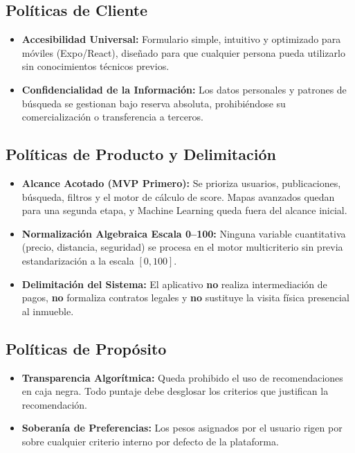 \documentclass[11pt,a4paper]{article}
\begin{document}
\subsection{Políticas de Cliente}
\begin{itemize}[leftmargin=*]
    \item \textbf{Accesibilidad Universal:} Formulario simple, intuitivo y optimizado para móviles (Expo/React), diseñado para que cualquier persona pueda utilizarlo sin conocimientos técnicos previos.
    \item \textbf{Confidencialidad de la Información:} Los datos personales y patrones de búsqueda se gestionan bajo reserva absoluta, prohibiéndose su comercialización o transferencia a terceros.
\end{itemize}

\subsection{Políticas de Producto y Delimitación}
\begin{itemize}[leftmargin=*]
    \item \textbf{Alcance Acotado (MVP Primero):} Se prioriza usuarios, publicaciones, búsqueda, filtros y el motor de cálculo de score. Mapas avanzados quedan para una segunda etapa, y Machine Learning queda fuera del alcance inicial.
    \item \textbf{Normalización Algebraica Escala 0--100:} Ninguna variable cuantitativa (precio, distancia, seguridad) se procesa en el motor multicriterio sin previa estandarización a la escala $[0, 100]$.
    \item \textbf{Delimitación del Sistema:} El aplicativo \textbf{no} realiza intermediación de pagos, \textbf{no} formaliza contratos legales y \textbf{no} sustituye la visita física presencial al inmueble.
\end{itemize}

\subsection{Políticas de Propósito}
\begin{itemize}[leftmargin=*]
    \item \textbf{Transparencia Algorítmica:} Queda prohibido el uso de recomendaciones en caja negra. Todo puntaje debe desglosar los criterios que justifican la recomendación.
    \item \textbf{Soberanía de Preferencias:} Los pesos asignados por el usuario rigen por sobre cualquier criterio interno por defecto de la plataforma.
\end{itemize}
\end{document}
